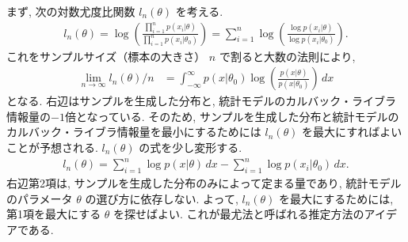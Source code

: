 \documentclass[a4paper, 12pt]{jarticle}
\begin{document}
まず, 次の対数尤度比関数 $l_n(\theta)$ を考える. 
\begin{align}
l_n(\theta) = \log \left( \frac{\prod_{i=1}^{n}p(x_i|\theta)}{\prod_{i=1}^{n}p(x_i|\theta_0)} \right) = \sum_{i=1}^{n}\log \left(\frac{\log p(x_i| \theta)}{\log p(x_i| \theta_0)}\right).
\end{align}
これをサンプルサイズ（標本の大きさ） $n$ で割ると大数の法則により, 
\begin{align}
\lim_{n\to \infty} l_n(\theta)/n &= \int_{-\infty}^{\infty} p(x|\theta_0)\log \left(\frac{p(x| \theta)}{ p(x| \theta_0)}\right) \, dx
\end{align}
となる. 右辺はサンプルを生成した分布と, 統計モデルのカルバック・ライブラ情報量の$-1$倍となっている. そのため, サンプルを生成した分布と統計モデルのカルバック・ライブラ情報量を最小にするためには $l_n(\theta)$ を最大にすればよいことが予想される.
$l_n(\theta)$ の式を少し変形する. 
\begin{align}
 l_n(\theta)= \sum_{i=1}^{n}\log p(x| \theta) \, dx -  \sum_{i=1}^{n}\log p(x_i| \theta_0)\, dx.
 \label{eqln}
\end{align}
右辺第2項は, サンプルを生成した分布のみによって定まる量であり, 統計モデルのパラメータ $\theta$ の選び方に依存しない. 
よって, $l_n(\theta)$ を最大にするためには, 第1項を最大にする $\theta$ を探せばよい. これが最尤法と呼ばれる推定方法のアイデアである.
\end{document}
